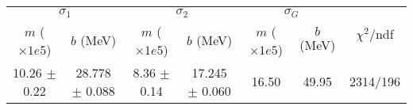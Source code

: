 \begin{tabular}{cc|cc|cc||c}
\multicolumn{2}{c|}{$\sigma_1$} & \multicolumn{2}{|c}{$\sigma_2$} & \multicolumn{2}{|c}{$\sigma_G$}  & \multirow{2}{*}{$\chi^2/$ndf}\\
$m$ ($\times1e5$) & $b$ (MeV) & $m$ ($\times1e5$) & $b$ (MeV) & $m$ ($\times1e5$) & $b$ (MeV) & \\
\hline
10.26 $\pm$ 0.22 & 28.778 $\pm$ 0.088 & 8.36 $\pm$ 0.14 & 17.245 $\pm$ 0.060 & 16.50 & 49.95 & 2314/196\\
\end{tabular}
